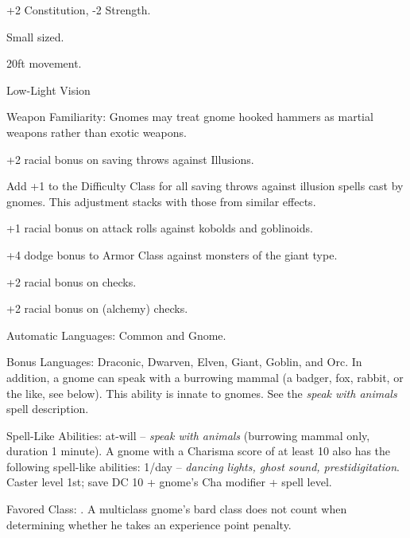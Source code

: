 
\begin{itemize*}
\item +2 Constitution, -2 Strength.
\item Small sized.
\item 20ft movement.
\item Low-Light Vision
\item Weapon Familiarity: Gnomes may treat gnome hooked hammers as martial weapons rather than exotic weapons.
\item +2 racial bonus on saving throws against Illusions.
\item Add +1 to the Difficulty Class for all saving throws against illusion spells cast by gnomes. This adjustment stacks with those from similar effects.
\item +1 racial bonus on attack rolls against kobolds and goblinoids.
\item +4 dodge bonus to Armor Class against monsters of the giant type.
\item +2 racial bonus on  checks.
\item +2 racial bonus on  (alchemy) checks.
\item Automatic Languages: Common and Gnome.
\item Bonus Languages: Draconic, Dwarven, Elven, Giant, Goblin, and Orc. In addition, a gnome can speak with a burrowing mammal (a badger, fox, rabbit, or the like, see below). This ability is innate to gnomes. See the \textit{speak with animals} spell description.
\item Spell-Like Abilities: at-will -- \textit{speak with animals} (burrowing mammal only, duration 1 minute). A gnome with a Charisma score of at least 10 also has the following spell-like abilities: 1/day -- \textit{dancing lights, ghost sound, prestidigitation}. Caster level 1st; save DC 10 + gnome's Cha modifier + spell level.
\item Favored Class: . A multiclass gnome's bard class does not count when determining whether he takes an experience point penalty.
\end{itemize*}
